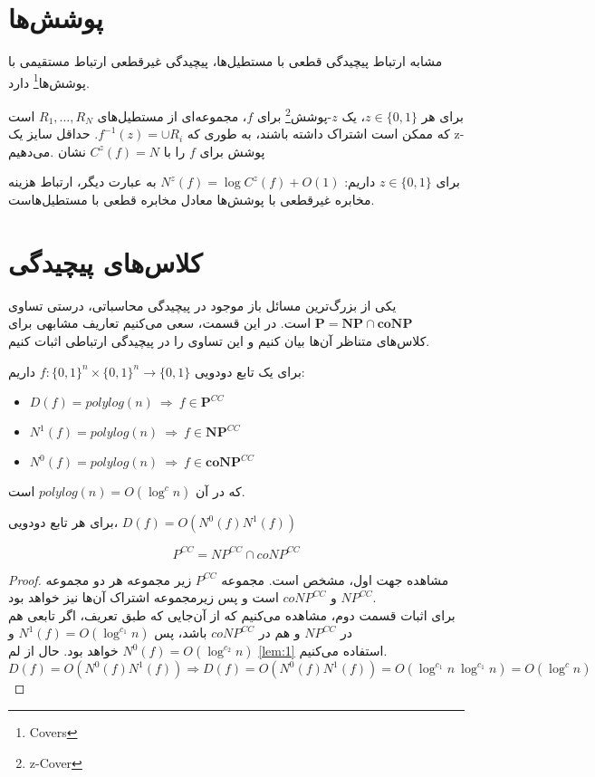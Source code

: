 \section{پوشش‌ها}

مشابه ارتباط پیچیدگی قطعی با مستطیل‌ها، پیچیدگی غیرقطعی ارتباط مستقیمی با پوشش‌ها\footnote{Covers} دارد.

\begin{definition}
برای هر $z \in \{0, 1\}$، یک $z$-پوشش\footnote{z-Cover} برای $f$، مجموعه‌ای از مستطیل‌های $R_1, \dots, R_N$ است که ممکن است اشتراک داشته باشند، به طوری که 
$f^{-1}(z) = \cup R_i$.
حداقل سایز یک z-پوشش برای $f$ را با $C^z(f) = N$ نشان .می‌دهیم
\end{definition}
\begin{theorem}
برای $z \in \{0, 1\}$ داریم: $N^z(f) = \log C^z(f) + O(1)$ به عبارت دیگر، ارتباط هزینه مخابره غیرقطعی با پوشش‌ها معادل مخابره قطعی با  مستطیل‌هاست.
\end{theorem}

\section{کلاس‌های پیچیدگی}

یکی از بزرگ‌ترین مسائل باز موجود در پیچیدگی محاسباتی، درستی تساوی $\mathbf{P} = \mathbf{NP} \cap \mathbf{coNP}$ است. در این قسمت، سعی می‌کنیم تعاریف مشابهی برای کلاس‌های متناظر آن‌ها بیان کنیم و این تساوی را در پیچیدگی ارتباطی اثبات کنیم.
\begin{definition}
 برای یک تابع دودویی $f: \{0, 1\}^n \times \{0, 1\}^n \rightarrow \{0, 1\}$ داریم:

\begin{itemize}
    \item $D(f) = polylog(n) \ \Rightarrow\ f \in \mathbf{P}^{CC}  $
     \item $N^1(f) = polylog(n) \ \Rightarrow\ f \in \mathbf{NP}^{CC}  $
     \item $N^0(f) = polylog(n) \ \Rightarrow\ f \in \mathbf{coNP}^{CC}  $
\end{itemize}

که در آن $polylog(n) = O(\log^c n)$ است.
\end{definition}
\begin{lemma} \label{lem:1}
 برای هر تابع دودویی، $D(f) = O(N^0(f)N^1(f))$
\end{lemma}
\begin{theorem}
\begin{equation*}
P^{CC} = NP^{CC} \cap coNP^{CC}
\end{equation*}
\end{theorem}
\begin{proof}
مشاهده جهت اول، مشخص است. مجموعه 
$P^{CC}$
زیر مجموعه هر دو مجموعه
$NP^{CC}$ و $coNP^{CC}$
است و پس زیرمجموعه اشتراک آن‌ها نیز خواهد بود. \\
برای اثبات قسمت دوم، مشاهده می‌کنیم که از آن‌جایی که طبق تعریف، اگر تابعی هم در 
$NP^{CC}$ و هم در $coNP^{CC}$
باشد، پس 
$N^1(f) = O(\log^{c_1} n)$ و 
$N^0(f) = O(\log^{c_2} n)$
خواهد بود. حال از لم \autoref{lem:1} استفاده می‌کنیم. 
\[D(f) = O(N^0(f)N^1(f)) \Rightarrow D(f) = O(N^0(f)N^1(f)) = O(\log^{c_1} n \  \log^{c_1} n) = O(\log^c n)\]
\end{proof}

